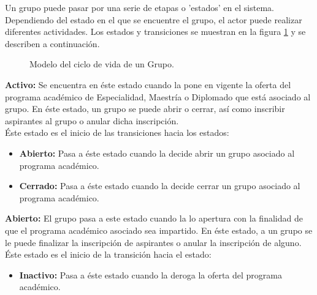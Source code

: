 Un grupo puede pasar por una serie de etapas o 'estados' en el sistema. Dependiendo del estado en el que se encuentre el grupo, el actor puede realizar diferentes actividades. Los estados y transiciones se muestran en la figura \ref{fig:MEgrupo} y se describen a continuación.\\


\begin{figure}[htbp!]
	\centering
	\caption{Modelo del ciclo de vida de un Grupo.}
	\label{fig:MEgrupo}
\end{figure}

\noindent \textbf{Activo:} Se encuentra en éste estado cuando la  pone en vigente la oferta del programa académico de  Especialidad, Maestría o Diplomado que está asociado al grupo. En éste estado, un grupo se puede abrir o cerrar, así como inscribir aspirantes al grupo o anular dicha inscripción.\\

Éste estado es el inicio de las transiciones hacia los estados:
\begin{itemize}
	\item \textbf{Abierto:} Pasa a éste estado cuando la  decide abrir un grupo asociado al programa académico.	
	\item \textbf{Cerrado:} Pasa a éste estado cuando la  decide cerrar un grupo asociado al programa académico.
\end{itemize}

\noindent \textbf{Abierto:} El grupo pasa a este estado cuando la  lo apertura con la finalidad de que el programa académico asociado sea impartido. En éste estado, a un grupo se le puede finalizar la inscripción de aspirantes o anular la inscripción de alguno.\\

Éste estado es el inicio de la transición hacia el estado:
\begin{itemize}
	\item \textbf{Inactivo:} Pasa a éste estado cuando la  deroga la oferta del programa académico.	
\end{itemize}

